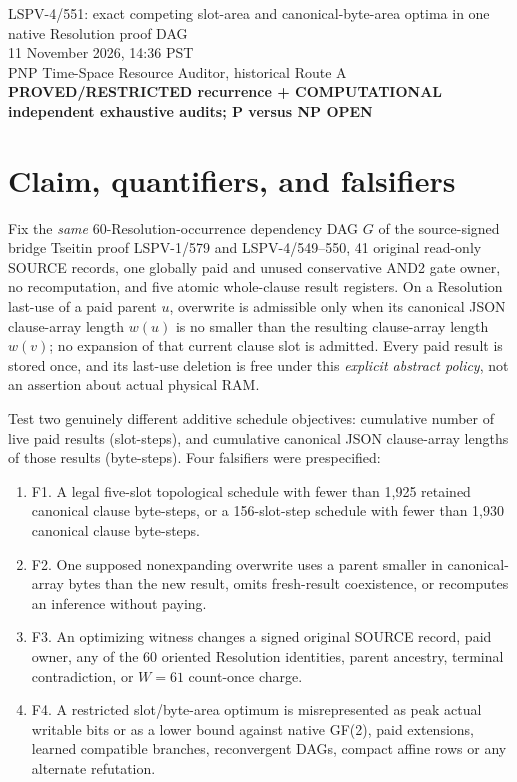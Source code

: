 \documentclass[11pt]{article}
\begin{document}
\begin{center}
{\Large LSPV-4/551: exact competing slot-area and canonical-byte-area optima in one native Resolution proof DAG}\\[5pt]
11 November 2026, 14:36 PST\\
PNP Time-Space Resource Auditor, historical Route A\\
\textbf{PROVED/RESTRICTED recurrence + COMPUTATIONAL independent exhaustive audits; P versus NP OPEN}
\end{center}

\section*{Claim, quantifiers, and falsifiers}
Fix the \emph{same} 60-Resolution-occurrence dependency DAG $G$ of the source-signed bridge Tseitin proof LSPV-1/579 and LSPV-4/549--550, 41 original read-only SOURCE records, one globally paid and unused conservative AND2 gate owner, no recomputation, and five atomic whole-clause result registers. On a Resolution last-use of a paid parent $u$, overwrite is admissible only when its canonical JSON clause-array length $w(u)$ is no smaller than the resulting clause-array length $w(v)$; no expansion of that current clause slot is admitted. Every paid result is stored once, and its last-use deletion is free under this \emph{explicit abstract policy}, not an assertion about actual physical RAM.

Test two genuinely different additive schedule objectives: cumulative number of live paid results (slot-steps), and cumulative canonical JSON clause-array lengths of those results (byte-steps). Four falsifiers were prespecified:
\begin{enumerate}
\item[] F1. A legal five-slot topological schedule with fewer than 1,925 retained canonical clause byte-steps, or a 156-slot-step schedule with fewer than 1,930 canonical clause byte-steps.
\item[] F2. One supposed nonexpanding overwrite uses a parent smaller in canonical-array bytes than the new result, omits fresh-result coexistence, or recomputes an inference without paying.
\item[] F3. An optimizing witness changes a signed original SOURCE record, paid owner, any of the 60 oriented Resolution identities, parent ancestry, terminal contradiction, or $W=61$ count-once charge.
\item[] F4. A restricted slot/byte-area optimum is misrepresented as peak actual writable bits or as a lower bound against native GF(2), paid extensions, learned compatible branches, reconvergent DAGs, compact affine rows or any alternate refutation.
\end{enumerate}
\end{document}
